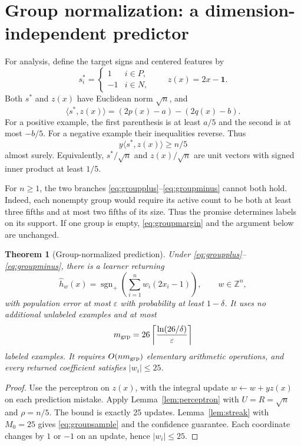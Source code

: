 \documentclass[11pt,a4paper]{article}
\newtheorem{theorem}{Theorem}
\theoremstyle{remark}
\newcommand{\sgnplus}{\operatorname{sgn}_{+}}
\newcommand{\ip}[2]{\langle #1,#2\rangle}
\newcommand{\1}{\mathbf 1}
\begin{document}
\section{Group normalization: a dimension-independent predictor}

For analysis, define the target signs and centered features by
\[
 s_i^*=\begin{cases}1&i\in P,\\-1&i\in N,\end{cases}
 \qquad z(x)=2x-\1.
\]
Both $s^*$ and $z(x)$ have Euclidean norm $\sqrt n$, and
\begin{equation}\label{eq:centeridentity}
 \ip{s^*}{z(x)}
 =(2p(x)-a)-(2q(x)-b).
\end{equation}
For a positive example, the first parenthesis is at least $a/5$ and the
second is at most $-b/5$. For a negative example their inequalities reverse.
Thus
\begin{equation}\label{eq:groupmargin}
 y\ip{s^*}{z(x)}\ge n/5
\end{equation}
almost surely. Equivalently, $s^*/\sqrt n$ and $z(x)/\sqrt n$ are unit
vectors with signed inner product at least $1/5$.

For $n\ge1$, the two branches \eqref{eq:groupplus}--\eqref{eq:groupminus}
cannot both hold. Indeed, each nonempty group would require its active count
to be both at least three fifths and at most two fifths of its size.
Thus the promise determines labels on its support. If one group is empty,
\eqref{eq:groupmargin} and the argument below are unchanged.

\begin{theorem}[Group-normalized prediction]\label{thm:group}
Under \eqref{eq:groupplus}--\eqref{eq:groupminus}, there is a learner returning
\[
 \widehat h_w(x)=\sgnplus\!\left(\sum_{i=1}^n w_i(2x_i-1)\right),
 \qquad w\in\mathbb Z^n,
\]
with population error at most $\varepsilon$ with probability at least
$1-\delta$. It uses no additional unlabeled examples and at most
\begin{equation}\label{eq:groupsample}
 m_{\rm grp}
 =26\left\lceil\frac{\ln(26/\delta)}{\varepsilon}\right\rceil
\end{equation}
labeled examples. It requires $O(nm_{\rm grp})$ elementary arithmetic operations,
and every returned coefficient satisfies $|w_i|\le25$.
\end{theorem}
\begin{proof}
Use the perceptron on $z(x)$, with the integral update
$w\leftarrow w+yz(x)$ on each prediction mistake. Apply
Lemma~\ref{lem:perceptron} with $U=R=\sqrt n$ and $\rho=n/5$.
The bound is exactly 25 updates. Lemma~\ref{lem:streak} with $M_0=25$
gives \eqref{eq:groupsample} and the confidence guarantee.
Each coordinate changes by $1$ or $-1$ on an update, hence $|w_i|\le25$.
\end{proof}
\end{document}
